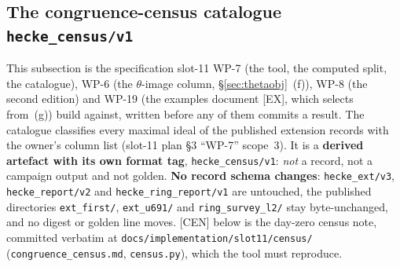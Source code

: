 \documentclass[11pt]{article}
\theoremstyle{remark}
\begin{document}
\subsection{The congruence-census catalogue \texttt{hecke\_census/v1}}\label{sec:census}
This subsection is the specification slot-11 WP-7 (the tool, the computed split, the catalogue),
WP-6 (the $\theta$-image column, \S\ref{sec:thetaobj}~(f)), WP-8 (the second edition) and WP-19
(the examples document [EX], which selects from~(g)) build against, written before any of them
commits a result. The catalogue classifies every maximal ideal of the published extension records
with the owner's column list (slot-11 plan \S3 ``WP-7'' scope~3). It is a \textbf{derived
artefact with its own format tag}, \texttt{hecke\_census/v1}: \emph{not} a record, not a campaign
output and not golden. \textbf{No record schema changes}: \texttt{hecke\_ext/v3},
\texttt{hecke\_report/v2} and \texttt{hecke\_ring\_report/v1} are untouched, the published
directories \texttt{ext\_first/}, \texttt{ext\_u691/} and \texttt{ring\_survey\_l2/} stay
byte-unchanged, and no digest or golden line moves. [CEN] below is the day-zero census note,
committed verbatim at \texttt{docs/implementation/slot11/census/} (\texttt{congruence\_census.md},
\texttt{census.py}), which the tool must reproduce.
\end{document}
